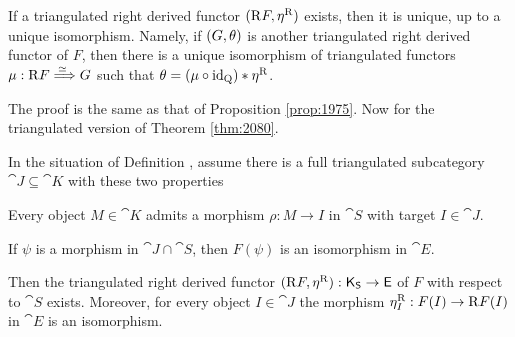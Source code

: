 \begin{prop} \label{prop:1350}
If a triangulated right derived functor $(\mathrm{R} F, \eta^{\mathrm{R}})$ exists, 
then it is unique, up to a unique isomorphism. Namely, if  $(G, \theta)$ is 
another triangulated right derived functor of $F$, then there is a unique 
isomorphism of 
triangulated functors $\mu : \mathrm{R} F \stackrel{\simeq\ }{\Longrightarrow} G$ such that 
$\theta = (\mu \circ \operatorname{id}_{\operatorname{Q}}) * \eta^{\mathrm{R}}$. 
\end{prop}

The proof is the same as that of Proposition \ref{prop:1975}.
Now for the triangulated version of Theorem \ref{thm:2080}.

\begin{thm} \label{thm:1470}
In the situation of Definition \tup{\ref{dfn:131}}, 
assume there is a full triangulated subcategory 
$\cat{J} \subseteq \cat{K}$
with these two properties\tup{:}
\begin{enumerate}
 Every object $M \in \cat{K}$ admits a morphism 
$\rho : M \to I$ in $\cat{S}$ with target $I \in \cat{J}$.

 If $\psi$ is a morphism in $\cat{J} \cap \cat{S}$, 
then $F(\psi)$ is an isomorphism in $\cat{E}$.
\end{enumerate}
Then the triangulated right derived functor
$(\mathrm{R} F, \eta^{\mathrm{R}}) : \operatorname{\mathsf{K}}_{\operatorname{\mathsf{S}}} \to \operatorname{\mathsf{E}}$ 
of $F$ with respect to $\cat{S}$ exists. 
Moreover, for every object $I \in \cat{J}$ the morphism  
$\eta^{\mathrm{R}}_I : F(I) \to \mathrm{R} F(I)$ 
in $\cat{E}$ is an isomorphism.
\end{thm}

